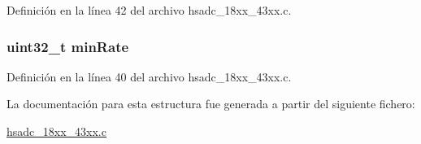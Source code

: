 Definición en la línea 42 del archivo hsadc\+\_\+18xx\+\_\+43xx.\+c.

\subsubsection[{\texorpdfstring{min\+Rate}{minRate}}]{\setlength{\rightskip}{0pt plus 5cm}uint32\+\_\+t min\+Rate}\hypertarget{struct_c_r_s_d_c_e_g___t_ac656152b25650f4bb70b5dccd40d53aa}{}\label{struct_c_r_s_d_c_e_g___t_ac656152b25650f4bb70b5dccd40d53aa}


Definición en la línea 40 del archivo hsadc\+\_\+18xx\+\_\+43xx.\+c.



La documentación para esta estructura fue generada a partir del siguiente fichero\+:\begin{DoxyCompactItemize}
\item 
\hyperlink{hsadc__18xx__43xx_8c}{hsadc\+\_\+18xx\+\_\+43xx.\+c}\end{DoxyCompactItemize}
